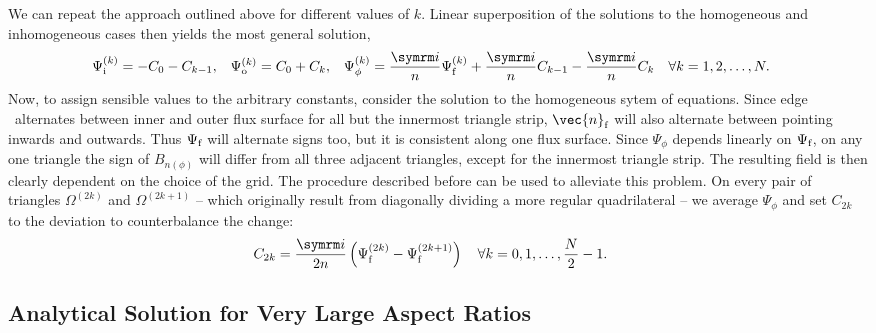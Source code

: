We can repeat the approach outlined above for different values of $k$. Linear superposition of the solutions to the homogeneous and inhomogeneous cases then yields the most general solution,
\begin{align}
  \Psi_{\inw}^{(k)} &= -C_{0} - C_{k-1}, & \Psi_{\out}^{(k)} &= C_{0} + C_{k}, & \Psi_{\phi}^{(k)} &= \frac{\im}{n} \Psi_{\fs}^{(k)} + \frac{\im}{n} C_{k-1} - \frac{\im}{n} C_{k} \quad \forall k = 1, 2, \dotsc, N.
\end{align}
Now, to assign sensible values to the arbitrary constants, consider the solution to the homogeneous sytem of equations. Since edge \fs\ alternates between inner and outer flux surface for all but the innermost triangle strip, $\vec{n}_{\fs}$ will also alternate between pointing inwards and outwards. Thus $\Psi_{\textrm{f}}$ will alternate signs too, but it is consistent along one flux surface. Since $\Psi_{\phi}$ depends linearly on $\Psi_{\textrm{f}}$, on any one triangle the sign of $B_{n (\phi)}$ will differ from all three adjacent triangles, except for the innermost triangle strip. The resulting field is then clearly dependent on the choice of the grid. The procedure described before can be used to alleviate this problem. On every pair of triangles $\Omega^{(2k)}$ and $\Omega^{(2k+1)}$ -- which originally result from diagonally dividing a more regular quadrilateral -- we average $\Psi_{\phi}$ and set $C_{2k}$ to the deviation to counterbalance the change:
\begin{align}
  C_{2k} &= \frac{\im}{2 n} \left( \Psi_{\fs}^{(2k)} - \Psi_{\fs}^{(2k+1)} \right) \quad \forall k = 0, 1, \dotsc, \frac{N}{2} - 1.
\end{align}

\subsection{Analytical Solution for Very Large Aspect Ratios}
\label{sec:analytical}

